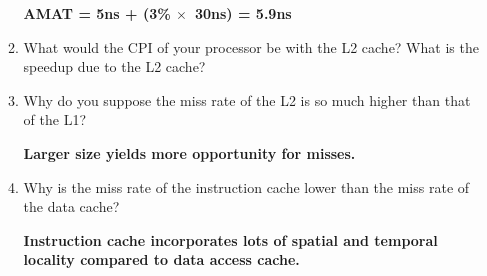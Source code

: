\documentclass{article}
\begin{document}
\begin{enumerate}
\begin{enumerate}
    \textbf{AMAT = 5ns + (3\% $\bm{\times}$\ 30ns) = 5.9ns}
    \item What would the CPI of your processor be with the L2 cache? What is the speedup due to the L2 cache?\par
    \textbf{}
    \item Why do you suppose the miss rate of the L2 is so much higher than that of the L1?\par
    \textbf{Larger size yields more opportunity for misses.}
    \item Why is the miss rate of the instruction cache lower than the miss rate of the data cache?\par
    \textbf{Instruction cache incorporates lots of spatial and temporal locality compared to data access cache.}
\end{enumerate}
\end{enumerate}
\end{document}
